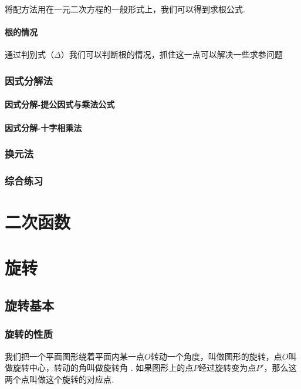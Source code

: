 \documentclass[lang=cn, 10pt, titlestyle=hang, oneside]{elegantbook}
\begin{document}
将配方法用在一元二次方程的一般形式上，我们可以得到求根公式.

\subsubsection{根的情况}

通过判别式（\(\Delta \)）我们可以判断根的情况，抓住这一点可以解决一些求参问题


\subsection{因式分解法}

\subsubsection{因式分解-提公因式与乘法公式}

\subsubsection{因式分解-十字相乘法}

\subsection{换元法}

\subsection{综合练习}

\chapter{二次函数}

\chapter{旋转}

\section{旋转基本}

\subsection{旋转的性质}

我们把一个平面图形绕着平面内某一点\(O \)转动一个角度，叫做图形的旋转，点\(O \)叫做旋转中心，转动的角叫做旋转角 . 如果图形上的点\(P \)经过旋转变为点\(P' \)，那么这两个点叫做这个旋转的对应点.
\end{document}
